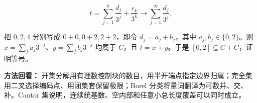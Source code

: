 \documentclass[11pt,a4paper]{article}
\begin{document}
\begin{equation*}
t=\sum_{j=1}^{k}\frac{d_j}{3^j}+\frac{r_k}{3^k}
\longrightarrow\sum_{j=1}^{\infty}\frac{d_j}{3^j}.
\tag{1.4.22}
\end{equation*}

把 \(0,2,4\) 分别写成 \(0+0,0+2,2+2\)，即令 \(d_j=a_j+b_j\)，其中
\(a_j,b_j\in\{0,2\}\)。则 \(x=\sum_ja_j3^{-j}\)、\(y=\sum_jb_j3^{-j}\)
均属于 \(C\)，且 \(t=x+y\)。于是 \([0,2]\subseteq C+C\)，证明等号。

\textbf{方法回看：}
开集分解用有理数控制块的数目，用半开端点指定边界归属；完全集用二叉选择编码点、用闭集套保留极限；Borel
分类将量词翻译为可数并、交、补。Cantor
集说明，连续统基数、空内部和任意小总长度覆盖可以同时成立。
\end{document}
